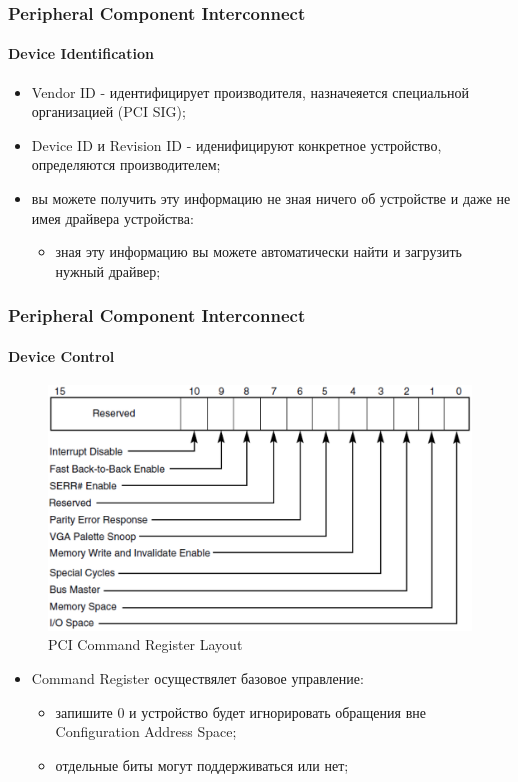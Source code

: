 \begin{frame}
\frametitle{Peripheral Component Interconnect}
\framesubtitle{Device Identification}
\begin{itemize}
  \item Vendor ID - идентифицирует производителя, назначеяется специальной
        организацией (PCI SIG);
  \item Device ID и Revision ID - иденифицируют конкретное устройство,
        определяются производителем;
  \item вы можете получить эту информацию не зная ничего об устройстве и даже не
        имея драйвера устройства:
    \begin{itemize}
      \item зная эту информацию вы можете автоматически найти и загрузить нужный
            драйвер;
    \end{itemize}
\end{itemize}
\end{frame}

\begin{frame}
\frametitle{Peripheral Component Interconnect}
\framesubtitle{Device Control}
\begin{figure}
  \centering\includegraphics[width=.5\linewidth]{pci-command-reg}
  \caption{PCI Command Register Layout}
\end{figure}
\begin{itemize}
  \item Command Register осуществялет базовое управление:
    \begin{itemize}
      \item запишите 0 и устройство будет игнорировать обращения вне
            Configuration Address Space;
      \item отдельные биты могут поддерживаться или нет;
    \end{itemize}
\end{itemize}
\end{frame}

